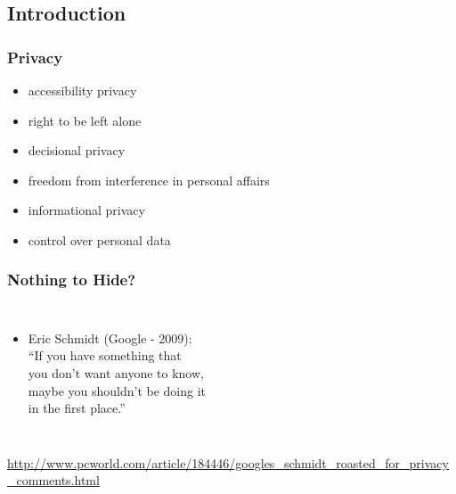 \documentclass[dvipsnames]{beamer}
\theoremstyle{plain}
\begin{document}
\subsection{Introduction}

\begin{frame}
  \frametitle{Privacy}

  \begin{itemize}
    \item accessibility privacy
    \item right to be left alone

    \pause
    \bigskip
    \item decisional privacy
    \item freedom from interference in personal affairs

    \pause
    \bigskip
    \item informational privacy
    \item control over personal data
  \end{itemize}
\end{frame}

\begin{frame}
  \frametitle{Nothing to Hide?}

  \begin{columns}

    \begin{itemize}
      \item Eric Schmidt (Google - 2009):\\
        \smallskip
        ``If you have something that\\
          you don't want anyone to know,\\
          maybe you shouldn't be doing it\\
          in the first place.''
    \end{itemize}
  \end{columns}

  \medskip
  \tiny{\url{http://www.pcworld.com/article/184446/googles_schmidt_roasted_for_privacy_comments.html}}\\
\end{frame}
\end{document}
